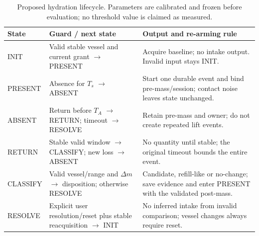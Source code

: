 \begin{table}[t]
\caption{Proposed hydration lifecycle. Parameters are calibrated and frozen before evaluation; no threshold value is claimed as measured.}\label{tab:states}
\centering\footnotesize\setlength{\tabcolsep}{4pt}
\begin{tabular}{@{}P{.13\textwidth}P{.35\textwidth}P{.44\textwidth}@{}}\toprule
State & Guard / next state & Output and re-arming rule\\\midrule
INIT & Valid stable vessel and current grant $\to$ PRESENT & Acquire baseline; no intake output. Invalid input stays INIT.\\
PRESENT & Absence for $T_s$ $\to$ ABSENT & Start one durable event and bind pre-mass/session; contact noise leaves state unchanged.\\
ABSENT & Return before $T_A$ $\to$ RETURN; timeout $\to$ RESOLVE & Retain pre-mass and owner; do not create repeated lift events.\\
RETURN & Stable valid window $\to$ CLASSIFY; new loss $\to$ ABSENT & No quantity until stable; the original timeout bounds the entire event.\\
CLASSIFY & Valid vessel/range and $\Delta m$ $\to$ disposition; otherwise RESOLVE & Candidate, refill-like or no-change; save evidence and enter PRESENT with the validated post-mass.\\
RESOLVE & Explicit user resolution/reset plus stable reacquisition $\to$ INIT & No inferred intake from invalid comparison; vessel changes always require reset.\\\bottomrule
\end{tabular}
\end{table}
